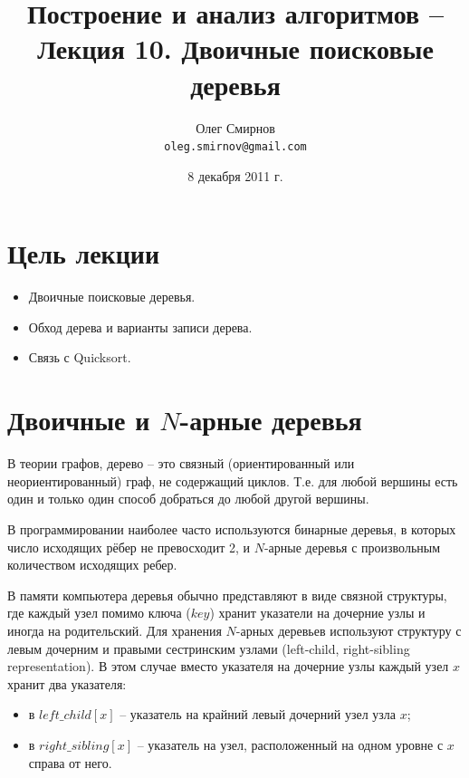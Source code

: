 \documentclass[11pt]{article}
\author{Олег Смирнов\\
\texttt{oleg.smirnov@gmail.com}}
\date{8 декабря 2011 г.}
\title{Построение и анализ алгоритмов -- Лекция 10. Двоичные поисковые деревья}
\begin{document}
\maketitle
\tableofcontents
\newpage

\setlength{\parskip}{1ex plus 0.5ex minus 0.2ex}

\section*{Цель лекции}
\begin{itemize}
\item Двоичные поисковые деревья.
\item Обход дерева и варианты записи дерева.
\item Связь с Quicksort.
\end{itemize}

\section{Двоичные и $N$-арные деревья}
В теории графов, дерево -- это связный (ориентированный или неориентированный)
граф, не содержащий циклов. Т.е. для любой вершины есть один и только один способ
добраться до любой другой вершины.

В программировании наиболее часто используются бинарные деревья, в которых число
исходящих рёбер не превосходит 2, и $N$-арные деревья с произвольным количеством
исходящих ребер.

В памяти компьютера деревья обычно представляют в виде связной структуры, где
каждый узел помимо ключа ($key$) хранит указатели на дочерние узлы и иногда на
родительский. Для хранения $N$-арных деревьев используют структуру с левым
дочерним и правыми сестринским узлами (left-child, right-sibling representation).
В этом случае вместо указателя на дочерние узлы каждый узел $x$ хранит два
указателя:
\begin{itemize}
\item в $left\_child[x]$ -- указатель на крайний левый дочерний узел узла $x$;
\item в $right\_sibling[x]$ -- указатель на узел, расположенный на одном уровне
  с $x$ справа от него.
\end{itemize}
\end{document}
